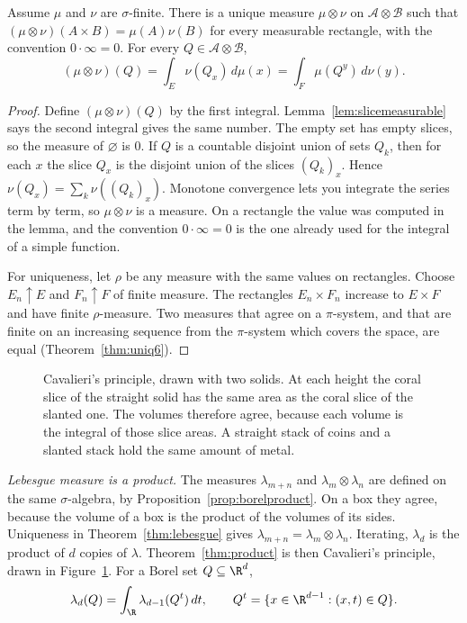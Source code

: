 \begin{theorem}\label{thm:product}
Assume $\mu$ and $\nu$ are $\sigma$-finite. There is a unique measure $\mu\otimes\nu$ on $\mathcal A\otimes\mathcal B$ such that $(\mu\otimes\nu)(A\times B)=\mu(A)\nu(B)$ for every measurable rectangle, with the convention $0\cdot\infty=0$. For every $Q\in\mathcal A\otimes\mathcal B$,
\[(\mu\otimes\nu)(Q)=\int_E\nu(Q_x)\,d\mu(x)=\int_F\mu(Q^y)\,d\nu(y).\]
\end{theorem}
\begin{proof}
Define $(\mu\otimes\nu)(Q)$ by the first integral. Lemma~\ref{lem:slicemeasurable} says the second integral gives the same number. The empty set has empty slices, so the measure of $\varnothing$ is $0$. If $Q$ is a countable disjoint union of sets $Q_k$, then for each $x$ the slice $Q_x$ is the disjoint union of the slices $(Q_k)_x$. Hence $\nu(Q_x)=\sum_k\nu((Q_k)_x)$. Monotone convergence lets you integrate the series term by term, so $\mu\otimes\nu$ is a measure. On a rectangle the value was computed in the lemma, and the convention $0\cdot\infty=0$ is the one already used for the integral of a simple function.

For uniqueness, let $\rho$ be any measure with the same values on rectangles. Choose $E_n\uparrow E$ and $F_n\uparrow F$ of finite measure. The rectangles $E_n\times F_n$ increase to $E\times F$ and have finite $\rho$-measure. Two measures that agree on a $\pi$-system, and that are finite on an increasing sequence from the $\pi$-system which covers the space, are equal (Theorem~\ref{thm:uniq6}).
\end{proof}

\begin{figure}[ht]
\centering
{}
\caption{Cavalieri's principle, drawn with two solids. At each height the coral slice of the straight solid has the same area as the coral slice of the slanted one. The volumes therefore agree, because each volume is the integral of those slice areas. A straight stack of coins and a slanted stack hold the same amount of metal.}
\label{fig:cavalieri}
\end{figure}

\emph{Lebesgue measure is a product.} The measures $\lambda_{m+n}$ and $\lambda_m\otimes\lambda_n$ are defined on the same $\sigma$-algebra, by Proposition~\ref{prop:borelproduct}. On a box they agree, because the volume of a box is the product of the volumes of its sides. Uniqueness in Theorem~\ref{thm:lebesgue} gives $\lambda_{m+n}=\lambda_m\otimes\lambda_n$. Iterating, $\lambda_d$ is the product of $d$ copies of $\lambda$. Theorem~\ref{thm:product} is then Cavalieri's principle, drawn in Figure~\ref{fig:cavalieri}. For a Borel set $Q\subseteq\R^d$,
\[\lambda_d(Q)=\int_\R\lambda_{d-1}(Q^t)\,dt,\qquad Q^t=\{x\in\R^{d-1}:(x,t)\in Q\}.\]

